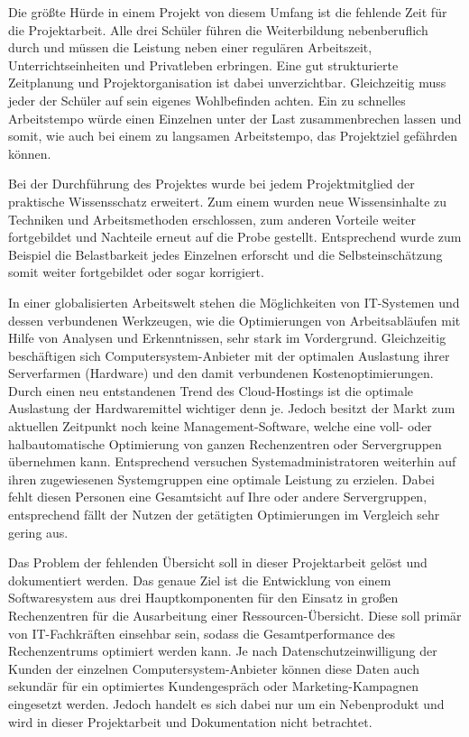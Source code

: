 Die größte Hürde in einem Projekt von diesem Umfang ist die fehlende Zeit für
die Projektarbeit. Alle drei Schüler führen die Weiterbildung nebenberuflich
durch und müssen die Leistung neben einer regulären Arbeitszeit,
Unterrichtseinheiten und Privatleben erbringen. Eine gut strukturierte
Zeitplanung und Projektorganisation ist dabei unverzichtbar. Gleichzeitig muss
jeder der Schüler auf sein eigenes Wohlbefinden achten. Ein zu schnelles
Arbeitstempo würde einen Einzelnen unter der Last zusammenbrechen lassen und
somit, wie auch bei einem zu langsamen Arbeitstempo, das Projektziel gefährden
können.

Bei der Durchführung des Projektes wurde bei jedem Projektmitglied der
praktische Wissensschatz erweitert. Zum einem wurden neue Wissensinhalte zu
Techniken und Arbeitsmethoden erschlossen, zum anderen Vorteile weiter
fortgebildet und Nachteile erneut auf die Probe gestellt. Entsprechend wurde
zum Beispiel die Belastbarkeit jedes Einzelnen erforscht und die
Selbsteinschätzung somit weiter fortgebildet oder sogar korrigiert.

In einer globalisierten Arbeitswelt stehen die Möglichkeiten von IT-Systemen
und dessen verbundenen Werkzeugen, wie die Optimierungen von Arbeitsabläufen
mit Hilfe von Analysen und Erkenntnissen, sehr stark im Vordergrund.
Gleichzeitig beschäftigen sich Computersystem-Anbieter mit der optimalen
Auslastung ihrer Serverfarmen (Hardware) und den damit verbundenen
Kostenoptimierungen. Durch einen neu entstandenen Trend des Cloud-Hostings ist
die optimale Auslastung der Hardwaremittel wichtiger denn je. Jedoch besitzt
der Markt zum aktuellen Zeitpunkt noch keine Management-Software, welche
eine voll- oder halbautomatische Optimierung von ganzen Rechenzentren oder
Servergruppen übernehmen kann. Entsprechend versuchen Systemadministratoren
weiterhin auf ihren zugewiesenen Systemgruppen eine optimale Leistung zu
erzielen. Dabei fehlt diesen Personen eine Gesamtsicht auf Ihre oder andere
Servergruppen, entsprechend fällt der Nutzen der getätigten Optimierungen im
Vergleich sehr gering aus.

Das Problem der fehlenden Übersicht soll in dieser Projektarbeit gelöst und
dokumentiert werden. Das genaue Ziel ist die Entwicklung von einem
Softwaresystem aus drei Hauptkomponenten für den Einsatz in großen
Rechenzentren für die Ausarbeitung einer Ressourcen-Übersicht. Diese soll
primär von IT-Fachkräften einsehbar sein, sodass die Gesamtperformance des
Rechenzentrums optimiert werden kann. Je nach Datenschutzeinwilligung der
Kunden der einzelnen Computersystem-Anbieter können diese Daten auch
sekundär für ein optimiertes Kundengespräch oder Marketing-Kampagnen eingesetzt
werden. Jedoch handelt es sich dabei nur um ein Nebenprodukt und wird in dieser
Projektarbeit und Dokumentation nicht betrachtet.

